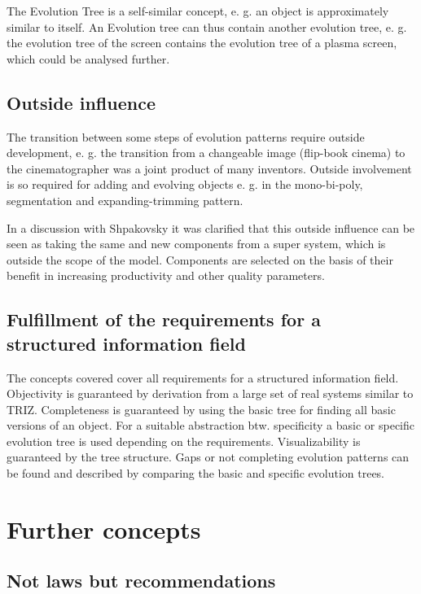 \documentclass[11pt,a4paper]{article}
\begin{document}
The Evolution Tree is a self-similar concept, e. g. an object is approximately
similar to itself. An Evolution tree can thus contain another evolution tree,
e. g. the evolution tree of the screen contains the evolution tree of a plasma
screen, which could be analysed further.

\subsection{Outside influence}

The transition between some steps of evolution patterns require outside
development, e. g. the transition from a changeable image (flip-book cinema)
to the cinematographer was a joint product of many inventors. Outside
involvement is so required for adding and evolving objects e. g. in the
mono-bi-poly, segmentation and expanding-trimming pattern.

In a discussion with Shpakovsky it was clarified that this outside influence
can be seen as taking the same and new components from a super system, which
is outside the scope of the model. Components are selected on the basis of
their benefit in increasing productivity and other quality parameters.

\subsection{Fulfillment of the requirements for a structured information
  field} 

The concepts covered cover all requirements for a structured information
field. Objectivity is guaranteed by derivation from a large set of real
systems similar to TRIZ. Completeness is guaranteed by using the basic tree
for finding all basic versions of an object. For a suitable abstraction
btw. specificity a basic or specific evolution tree is used depending on the
requirements. Visualizability is guaranteed by the tree structure. Gaps or not
completing evolution patterns can be found and described by comparing the
basic and specific evolution trees.

\section{Further concepts}

\subsection{Not laws but recommendations}
\end{document}
